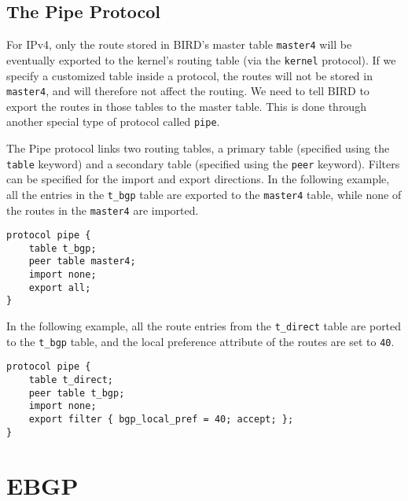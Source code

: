 \begin{lstlisting}

\end{lstlisting}
 


\subsection{The Pipe Protocol} 

For IPv4, only the route stored in BIRD's master table \texttt{master4} will be eventually
exported to the kernel's routing table (via the \texttt{kernel} protocol). 
If we specify a customized table
inside a protocol, the routes will not be stored in \texttt{master4},
and will therefore not affect the routing. We need to tell BIRD
to export the routes in those tables to the master table. This is done 
through another special type of protocol called \texttt{pipe}. 

The Pipe protocol links two routing tables, a primary table (specified using
the \texttt{table} keyword) and a secondary table (specified using 
the \texttt{peer} keyword). Filters can be specified for the import
and export directions. In the following example, all the entries
in the \texttt{t\_bgp} table are exported to the \texttt{master4} table,
while none of the routes in the \texttt{master4} are imported. 

\begin{lstlisting}
protocol pipe {
    table t_bgp;
    peer table master4;
    import none;
    export all;
}
\end{lstlisting}

In the following example, all the route entries from the \texttt{t\_direct}
table are ported to the \texttt{t\_bgp} table, and the local preference
attribute of the routes are set to \texttt{40}.

\begin{lstlisting}
protocol pipe {
    table t_direct;
    peer table t_bgp;
    import none;
    export filter { bgp_local_pref = 40; accept; };
}
\end{lstlisting}
 

\section{EBGP} 


